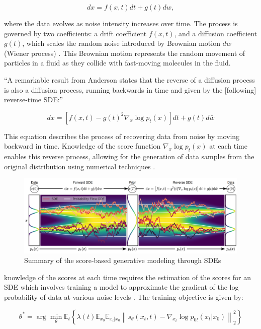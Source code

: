 \[ dx = f(x, t)dt + g(t)dw, \]

\citep{yangdiffusionSummary} where the data evolves as noise intensity increases over time. The process is governed by two coefficients: a drift coefficient \( f(x, t) \), and a diffusion coefficient \( g(t) \), which scales the random noise introduced by Brownian motion \( dw \) (Wiener process) \citep{song2020score}. This Brownian motion represents the random movement of particles in a fluid as they collide with fast-moving molecules in the fluid. 

``A remarkable result from Anderson \citep{anderson1982313} states that the reverse of a diffusion process is also a diffusion process, running backwards in time and given by the [following] reverse-time SDE:\@'' \citep{song2020score}

\[ dx = \left[ f(x, t) - g(t)^2 \nabla_x \log p_t(x) \right] dt + g(t)d\bar{w} \]

This equation describes the process of recovering data from noise by moving backward in time. Knowledge of the score function \( \nabla_x \log p_t(x) \) at each time enables this reverse process, allowing for the generation of data samples from the original distribution using numerical techniques \citep{song2020score}.

\begin{figure}[ht]
  \centering
    \includegraphics[width=1\columnwidth]{figures/DiffusionModels_SDEs.png}
    \caption{Summary of the score-based generative modeling through SDEs \citep{song2020score}}\label{fig:DM_SDEs}
\end{figure}

knowledge of the scores at each time requires the estimation of the scores for an SDE which involves training a model to approximate the gradient of the log probability of data at various noise levels \citep{song2020score}. The training objective is given by:

\[
\theta^* = \arg\min_\theta \mathbb{E}_t \left\{ \lambda(t) \mathbb{E}_{x_0} \mathbb{E}_{x_t|x_0} \left\| s_\theta(x_t, t) - \nabla_{x_t} \log p_{0t}(x_t | x_0) \right\|_2^2 \right\}
\]

